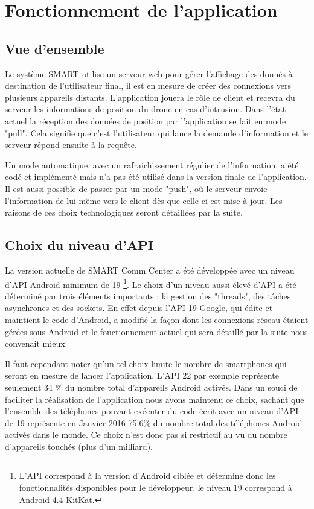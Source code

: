 \section{Fonctionnement de l'application}

\subsection{Vue d'ensemble}

	Le système SMART utilise un serveur web pour gérer l'affichage des donnés à destination de l'utilisateur final, il est en mesure de créer des connexions vers plusieurs appareils distants. L'application jouera le rôle de client et recevra du serveur les informations de position du drone en cas d'intrusion. Dans l'état actuel la réception des données de position par l'application se fait en mode "pull". Cela signifie que c'est l'utilisateur qui lance la demande d'information et le serveur répond ensuite à la requête.
	
	Un mode automatique, avec un rafraichissement régulier de l'information, a été codé et implémenté mais n'a pas été utilisé dans la version finale de l'application. Il est aussi possible de passer par un mode "push", où le serveur envoie l'information de lui même vers le client dès que celle-ci est mise à jour. Les raisons de ces choix technologiques seront détaillées par la suite.


\subsection{Choix du niveau d'API}

	La version actuelle de SMART Comm Center a été développée avec un niveau d'API Android minimum de 19 \footnote{L'API correspond à la version d'Android ciblée et détermine donc les fonctionnalités disponibles pour le développeur. le niveau 19 correspond à Android 4.4 KitKat.}. Le choix d'un niveau aussi élevé d'API a été déterminé par trois éléments importants : la gestion des "threads", des tâches asynchrones et des sockets. En effet depuis l'API 19 Google, qui édite et maintient le code d'Android, a modifié la façon dont les connexions réseau étaient gérées sous Android et le fonctionnement actuel qui sera détaillé par la suite nous convenait mieux. 
	
	Il faut cependant noter qu'un tel choix limite le nombre de smartphones qui seront en mesure de lancer l'application. L'API 22 par exemple représente seulement 34 \% du nombre total d'appareils Android activés. Dans un souci de faciliter la réalisation de l'application nous avons maintenu ce choix, sachant que l'ensemble des téléphones pouvant exécuter du code écrit avec un niveau d'API de 19 représente en Janvier 2016 75.6\% du nombre total des téléphones Android activés dans le monde. Ce choix n'est donc pas si restrictif au vu du nombre d'appareils touchés (plus d'un milliard).

